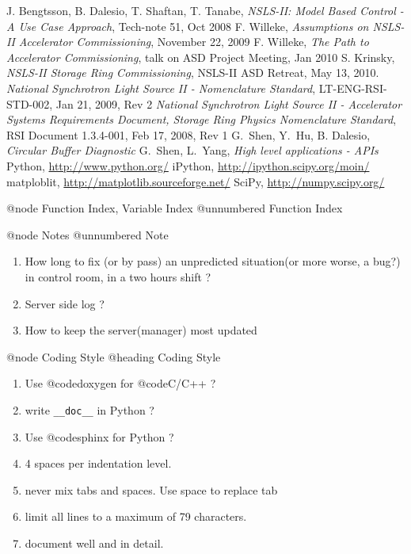 \documentclass[letterpaper,showtrims]{memoir}
\begin{document}
\begin{thebibliography}{99}
 J. Bengtsson, B. Dalesio, T. Shaftan, T. Tanabe, \emph{NSLS-II:
Model Based Control - A Use Case Approach}, Tech-note 51, Oct 2008 
 F. Willeke, \emph{Assumptions on NSLS-II Accelerator Commissioning}, November 22, 2009
 F. Willeke, \emph{The Path to Accelerator Commissioning}, talk
on ASD Project Meeting, Jan 2010
 S. Krinsky, \emph{NSLS-II Storage Ring Commissioning}, NSLS-II ASD Retreat, May 13, 2010.
 \emph{National Synchrotron Light Source II - Nomenclature Standard},
LT-ENG-RSI-STD-002, Jan 21, 2009, Rev 2
 \emph{National Synchrotron Light Source II - Accelerator Systems
Requirements Document, Storage Ring Physics Nomenclature Standard},
RSI Document 1.3.4-001, Feb 17, 2008, Rev 1
 G.~Shen, Y.~Hu, B. Dalesio, \emph{Circular Buffer Diagnostic}
 G.~Shen, L.~Yang, \emph{High level applications - APIs}
 Python, \url{http://www.python.org/}
 iPython, \url{http://ipython.scipy.org/moin/}
 matploblit, \url{http://matplotlib.sourceforge.net/}
 SciPy, \url{http://numpy.scipy.org/}
\end{thebibliography}

\pagestyle{index}
\printindex

@node Function Index, Variable Index
@unnumbered Function Index




@node Notes
@unnumbered Note

\begin{enumerate}
\item How long to fix (or by pass) an unpredicted situation(or more worse, a bug?) in control room, in a two hours shift ?
\item Server side log ?
\item How to keep the server(manager) most updated
\end{enumerate}

@node Coding Style
@heading Coding Style

\begin{enumerate}
\item Use @code{doxygen} for @code{C/C++} ?
\item write \verb+__doc__+ in Python ?
\item Use @code{sphinx} for Python ?
\item 4 spaces per indentation level.
\item never mix tabs and spaces. Use space to replace tab
\item limit all lines to a maximum of 79 characters.
\item document well and in detail.
\end{enumerate}
\end{document}
